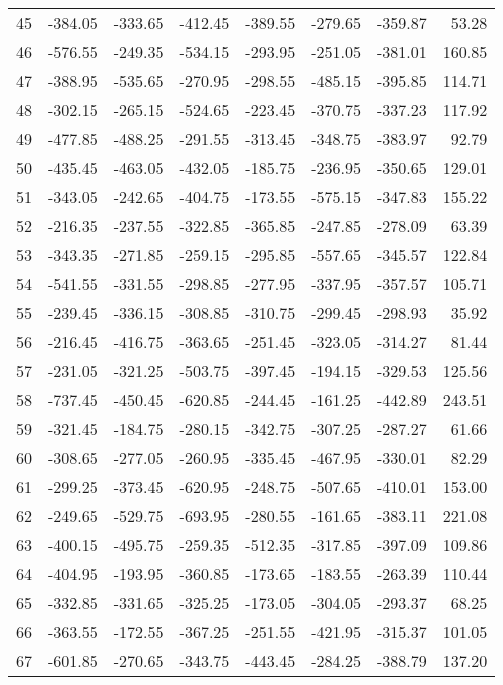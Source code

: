 \begin{longtable}{rrrrrrrr}
45 & -384.05 & -333.65 & -412.45 & -389.55 & -279.65 & -359.87 & 53.28  \\
46 & -576.55 & -249.35 & -534.15 & -293.95 & -251.05 & -381.01 & 160.85  \\
47 & -388.95 & -535.65 & -270.95 & -298.55 & -485.15 & -395.85 & 114.71  \\
48 & -302.15 & -265.15 & -524.65 & -223.45 & -370.75 & -337.23 & 117.92  \\
49 & -477.85 & -488.25 & -291.55 & -313.45 & -348.75 & -383.97 & 92.79  \\
50 & -435.45 & -463.05 & -432.05 & -185.75 & -236.95 & -350.65 & 129.01  \\
51 & -343.05 & -242.65 & -404.75 & -173.55 & -575.15 & -347.83 & 155.22  \\
52 & -216.35 & -237.55 & -322.85 & -365.85 & -247.85 & -278.09 & 63.39  \\
53 & -343.35 & -271.85 & -259.15 & -295.85 & -557.65 & -345.57 & 122.84  \\
54 & -541.55 & -331.55 & -298.85 & -277.95 & -337.95 & -357.57 & 105.71  \\
55 & -239.45 & -336.15 & -308.85 & -310.75 & -299.45 & -298.93 & 35.92  \\
56 & -216.45 & -416.75 & -363.65 & -251.45 & -323.05 & -314.27 & 81.44  \\
57 & -231.05 & -321.25 & -503.75 & -397.45 & -194.15 & -329.53 & 125.56  \\
58 & -737.45 & -450.45 & -620.85 & -244.45 & -161.25 & -442.89 & 243.51  \\
59 & -321.45 & -184.75 & -280.15 & -342.75 & -307.25 & -287.27 & 61.66  \\
60 & -308.65 & -277.05 & -260.95 & -335.45 & -467.95 & -330.01 & 82.29  \\
61 & -299.25 & -373.45 & -620.95 & -248.75 & -507.65 & -410.01 & 153.00  \\
62 & -249.65 & -529.75 & -693.95 & -280.55 & -161.65 & -383.11 & 221.08  \\
63 & -400.15 & -495.75 & -259.35 & -512.35 & -317.85 & -397.09 & 109.86  \\
64 & -404.95 & -193.95 & -360.85 & -173.65 & -183.55 & -263.39 & 110.44  \\
65 & -332.85 & -331.65 & -325.25 & -173.05 & -304.05 & -293.37 & 68.25  \\
66 & -363.55 & -172.55 & -367.25 & -251.55 & -421.95 & -315.37 & 101.05  \\
67 & -601.85 & -270.65 & -343.75 & -443.45 & -284.25 & -388.79 & 137.20  \\

\end{longtable}

